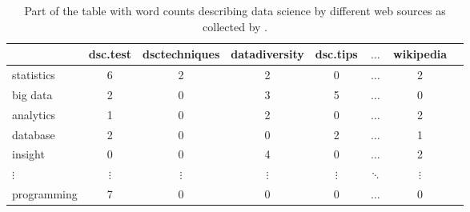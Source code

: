 \documentclass[article]{jdssv}
\begin{document}
\begin{table}
\caption{Part of the table with word counts describing data science by different web sources as collected by \citet{Lubbe2018}.}
\label{tab:word_counts}
\begin{center}
\begin{tabular}{lccccccc} \hline
            & dsc.test & dsctechniques & datadiversity & dsc.tips & $\ldots$ & wikipedia \\ \hline
statistics  &       6  &           2   &          2    &    0     & $\ldots$ &  2 \\
big data    &       2  &           0   &          3    &    5     & $\ldots$ &  0 \\
analytics   &       1  &           0   &          2    &    0     & $\ldots$ &  2 \\
database    &       2  &           0   &          0    &    2     & $\ldots$ &  1 \\
insight     &       0  &           0   &          4    &    0     & $\ldots$ &  2 \\
$\vdots$    & $\vdots$ &    $\vdots$   &   $\vdots$    & $\vdots$ &$ \ddots$ & $\vdots$ \\
programming &       7  &           0   &          0    &    0     & $\ldots$ &  0 \\
\hline
\end{tabular}
\end{center}
\end{table}
\end{document}
